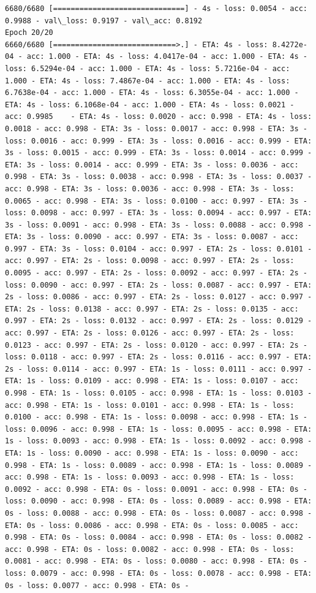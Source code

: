 \documentclass[11pt]{article}
\begin{document}
\begin{Verbatim}[commandchars=\\\{\}]
6680/6680 [==============================] - 4s - loss: 0.0054 - acc: 0.9988 - val\_loss: 0.9197 - val\_acc: 0.8192
Epoch 20/20
6660/6680 [============================>.] - ETA: 4s - loss: 8.4272e-04 - acc: 1.000 - ETA: 4s - loss: 4.0417e-04 - acc: 1.000 - ETA: 4s - loss: 6.5294e-04 - acc: 1.000 - ETA: 4s - loss: 5.7216e-04 - acc: 1.000 - ETA: 4s - loss: 7.4867e-04 - acc: 1.000 - ETA: 4s - loss: 6.7638e-04 - acc: 1.000 - ETA: 4s - loss: 6.3055e-04 - acc: 1.000 - ETA: 4s - loss: 6.1068e-04 - acc: 1.000 - ETA: 4s - loss: 0.0021 - acc: 0.9985    - ETA: 4s - loss: 0.0020 - acc: 0.998 - ETA: 4s - loss: 0.0018 - acc: 0.998 - ETA: 3s - loss: 0.0017 - acc: 0.998 - ETA: 3s - loss: 0.0016 - acc: 0.999 - ETA: 3s - loss: 0.0016 - acc: 0.999 - ETA: 3s - loss: 0.0015 - acc: 0.999 - ETA: 3s - loss: 0.0014 - acc: 0.999 - ETA: 3s - loss: 0.0014 - acc: 0.999 - ETA: 3s - loss: 0.0036 - acc: 0.998 - ETA: 3s - loss: 0.0038 - acc: 0.998 - ETA: 3s - loss: 0.0037 - acc: 0.998 - ETA: 3s - loss: 0.0036 - acc: 0.998 - ETA: 3s - loss: 0.0065 - acc: 0.998 - ETA: 3s - loss: 0.0100 - acc: 0.997 - ETA: 3s - loss: 0.0098 - acc: 0.997 - ETA: 3s - loss: 0.0094 - acc: 0.997 - ETA: 3s - loss: 0.0091 - acc: 0.998 - ETA: 3s - loss: 0.0088 - acc: 0.998 - ETA: 3s - loss: 0.0090 - acc: 0.997 - ETA: 3s - loss: 0.0087 - acc: 0.997 - ETA: 3s - loss: 0.0104 - acc: 0.997 - ETA: 2s - loss: 0.0101 - acc: 0.997 - ETA: 2s - loss: 0.0098 - acc: 0.997 - ETA: 2s - loss: 0.0095 - acc: 0.997 - ETA: 2s - loss: 0.0092 - acc: 0.997 - ETA: 2s - loss: 0.0090 - acc: 0.997 - ETA: 2s - loss: 0.0087 - acc: 0.997 - ETA: 2s - loss: 0.0086 - acc: 0.997 - ETA: 2s - loss: 0.0127 - acc: 0.997 - ETA: 2s - loss: 0.0138 - acc: 0.997 - ETA: 2s - loss: 0.0135 - acc: 0.997 - ETA: 2s - loss: 0.0132 - acc: 0.997 - ETA: 2s - loss: 0.0129 - acc: 0.997 - ETA: 2s - loss: 0.0126 - acc: 0.997 - ETA: 2s - loss: 0.0123 - acc: 0.997 - ETA: 2s - loss: 0.0120 - acc: 0.997 - ETA: 2s - loss: 0.0118 - acc: 0.997 - ETA: 2s - loss: 0.0116 - acc: 0.997 - ETA: 2s - loss: 0.0114 - acc: 0.997 - ETA: 1s - loss: 0.0111 - acc: 0.997 - ETA: 1s - loss: 0.0109 - acc: 0.998 - ETA: 1s - loss: 0.0107 - acc: 0.998 - ETA: 1s - loss: 0.0105 - acc: 0.998 - ETA: 1s - loss: 0.0103 - acc: 0.998 - ETA: 1s - loss: 0.0101 - acc: 0.998 - ETA: 1s - loss: 0.0100 - acc: 0.998 - ETA: 1s - loss: 0.0098 - acc: 0.998 - ETA: 1s - loss: 0.0096 - acc: 0.998 - ETA: 1s - loss: 0.0095 - acc: 0.998 - ETA: 1s - loss: 0.0093 - acc: 0.998 - ETA: 1s - loss: 0.0092 - acc: 0.998 - ETA: 1s - loss: 0.0090 - acc: 0.998 - ETA: 1s - loss: 0.0090 - acc: 0.998 - ETA: 1s - loss: 0.0089 - acc: 0.998 - ETA: 1s - loss: 0.0089 - acc: 0.998 - ETA: 1s - loss: 0.0093 - acc: 0.998 - ETA: 1s - loss: 0.0092 - acc: 0.998 - ETA: 0s - loss: 0.0091 - acc: 0.998 - ETA: 0s - loss: 0.0090 - acc: 0.998 - ETA: 0s - loss: 0.0089 - acc: 0.998 - ETA: 0s - loss: 0.0088 - acc: 0.998 - ETA: 0s - loss: 0.0087 - acc: 0.998 - ETA: 0s - loss: 0.0086 - acc: 0.998 - ETA: 0s - loss: 0.0085 - acc: 0.998 - ETA: 0s - loss: 0.0084 - acc: 0.998 - ETA: 0s - loss: 0.0082 - acc: 0.998 - ETA: 0s - loss: 0.0082 - acc: 0.998 - ETA: 0s - loss: 0.0081 - acc: 0.998 - ETA: 0s - loss: 0.0080 - acc: 0.998 - ETA: 0s - loss: 0.0079 - acc: 0.998 - ETA: 0s - loss: 0.0078 - acc: 0.998 - ETA: 0s - loss: 0.0077 - acc: 0.998 - ETA: 0s - 
\end{Verbatim}
\end{document}
